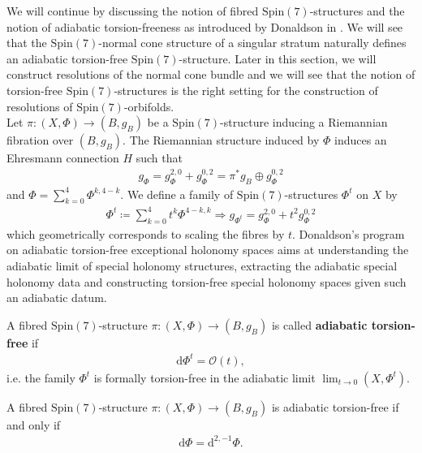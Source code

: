 \documentclass[psamsfonts]{amsart}
\theoremstyle{plain}
\theoremstyle{definition}{
\newtheorem{defi}{Definition}[section]
\newtheorem{ass}{Assumption}
\newtheorem*{nota}{Notation}}
\theoremstyle{remark}{
\newtheorem{rem}{Remark}
\newtheorem{ex}{Example}}
\theoremstyle{plain}{
\newtheorem{thm}{Theorem}[section]
\newtheorem{lem}{Lemma}[section]
\newtheorem{cor}{Corollary}[section]
\newtheorem{prop}{Proposition}[section]
\newtheorem{con}{Conjecture}[section]}
\newcommand{\m}[1]{{\mathrm{#1}}}
\begin{document}
We will continue by discussing the notion of fibred $\m{Spin}(7)$-structures and the notion of adiabatic torsion-freeness as introduced by Donaldson in \cite{donaldson2016adiabaticlimitscoassociativekovalevlefschetz}. We will see that the $\m{Spin}(7)$-normal cone structure of a singular stratum naturally defines an adiabatic torsion-free $\m{Spin}(7)$-structure. Later in this section, we will construct resolutions of the normal cone bundle and we will see that the notion of torsion-free $\m{Spin}(7)$-structures is the right setting for the construction of resolutions of $\m{Spin}(7)$-orbifolds.\\

Let $\pi\colon (X,\Phi)\rightarrow (B,g_B)$ be a $\m{Spin}(7)$-structure inducing a Riemannian fibration over $(B,g_B)$. The Riemannian structure induced by $\Phi$ induces an Ehresmann connection $H$ such that 
\begin{align*}
    g_\Phi=g^{2,0}_\Phi+g^{0,2}_\Phi=\pi^*g_B\oplus g^{0,2}_\Phi
\end{align*}
and $\Phi=\sum_{k=0}^4\Phi^{k,4-k}$. We define a family of $\m{Spin}(7)$-structures $\Phi^t$ on $X$ by 
\begin{align*}
    \Phi^t\coloneqq \sum_{k=0}^4t^k\Phi^{4-k,k}\Rightarrow g_{\Phi^t}=g^{2,0}_\Phi+t^2g^{0,2}_\Phi
\end{align*}
which geometrically corresponds to scaling the fibres by $t$. Donaldson's program on adiabatic torsion-free exceptional holonomy spaces aims at understanding the adiabatic limit of special holonomy structures, extracting the adiabatic special holonomy data and constructing torsion-free special holonomy spaces given such an adiabatic datum.


\begin{defi}
A fibred $\m{Spin}(7)$-structure $\pi\colon (X,\Phi)\rightarrow (B,g_B)$ is called \textbf{adiabatic torsion-free} if 
    \begin{align*}
        \m{d}\Phi^t=\mathcal{O}(t), 
    \end{align*}
    i.e. the family $\Phi^t$ is formally torsion-free in the adiabatic limit $\lim_{t\to 0}(X, \Phi^t)$. 
\end{defi}

\begin{lem}
    A fibred $\m{Spin}(7)$-structure $\pi\colon (X,\Phi)\rightarrow (B,g_B)$ is adiabatic torsion-free if and only if 
    \begin{align*}
        \m{d}\Phi=\m{d}^{2,-1}\Phi.
    \end{align*}
\end{lem}
\end{document}
